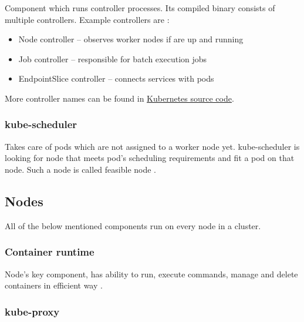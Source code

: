 Component which runs controller processes. Its compiled binary consists of multiple controllers. Example controllers are \cite{KubernetesArch}:

\begin{itemize}
    \item Node controller -- observes worker nodes if are up and running
    \item Job controller -- responsible for batch execution jobs
    \item EndpointSlice controller -- connects services with pods
\end{itemize}

More controller names can be found in \href{https://github.com/kubernetes/kubernetes/blob/master/cmd/kube-controller-manager/names/controller_names.go}{Kubernetes source code}.


\subsubsection{kube-scheduler}
\label{sec:kubeScheduler}

Takes care of pods which are not assigned to a worker node yet. kube-scheduler is looking for node that meets pod's scheduling requirements and fit a pod on that node. Such a node is called feasible node \cite{KubernetesScheduler}.


\subsection{Nodes}
\label{sec:k8sNodes}
All of the below mentioned components run on every node in a cluster. 

\subsubsection{Container runtime}
\label{sec:containerRuntime}

Node's key component, has ability to run, execute commands, manage and delete containers in efficient way \cite{KubernetesArch}. 



\subsubsection{kube-proxy}
\label{sec:kubeProxy}

